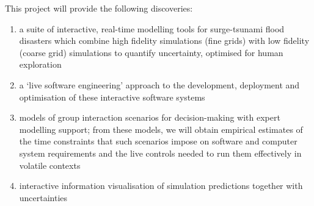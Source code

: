 This project will provide the following discoveries:
\begin{enumerate}

\item a suite of interactive, real-time modelling tools for
  surge-tsunami flood disasters which combine high fidelity
  simulations (fine grids) with low fidelity (coarse grid) simulations
  to quantify uncertainty, optimised for human exploration

\item a `live software engineering' approach to the development,
  deployment and optimisation of these interactive software systems

\item models of group interaction scenarios for decision-making with
  expert modelling support; from these models, we will obtain
  empirical estimates of the time constraints that such scenarios
  impose on software and computer system requirements and the live
  controls needed to run them effectively in volatile contexts

\item interactive information visualisation of simulation predictions
together with uncertainties


\end{enumerate}
\fi
